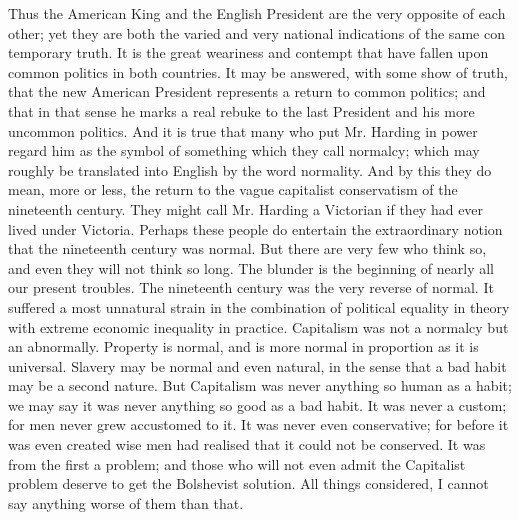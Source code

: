 \documentclass{book}
\begin{document}
Thus the American King and the English President are the very opposite of each other; yet they are both the varied and very national indications of the same con temporary truth. It is the great weariness and contempt that have fallen upon common politics in both countries. It may be answered, with some show of truth, that the new American President represents a return to common politics; and that in that sense he marks a real rebuke to the last President and his more uncommon politics. And it is true that many who put Mr. Harding in power regard him as the symbol of something which they call normalcy; which may roughly be translated into English by the word normality. And by this they do mean, more or less, the return to the vague capitalist conservatism of the nineteenth century. They might call Mr. Harding a Victorian if they had ever lived under Victoria. Perhaps these people do entertain the extraordinary notion that the nineteenth century was normal. But there are very few who think so, and even they will not think so long. The blunder is the beginning of nearly all our present troubles. The nineteenth century was the very reverse of normal. It suffered a most unnatural strain in the combination of political equality in theory with extreme economic inequality in practice. Capitalism was not a normalcy but an abnormally. Property is normal, and is more normal in proportion as it is universal. Slavery may be normal and even natural, in the sense that a bad habit may be a second nature. But Capitalism was never anything so human as a habit; we may say it was never anything so good as a bad habit. It was never a custom; for men never grew accustomed to it. It was never even conservative; for before it was even created wise men had realised that it could not be conserved. It was from the first a problem; and those who will not even admit the Capitalist problem deserve to get the Bolshevist solution. All things considered, I cannot say anything worse of them than that.
\end{document}
